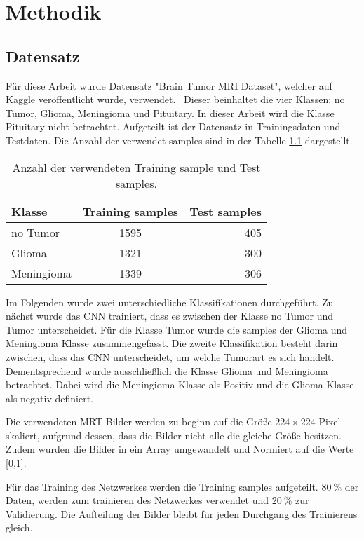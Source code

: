 \chapter{Methodik}

\section{Datensatz}
Für diese Arbeit wurde Datensatz "Brain Tumor MRI Dataset", welcher auf Kaggle veröffentlicht wurde, verwendet.~\cite{msoud_nickparvar_2021}
Dieser beinhaltet die vier Klassen: no Tumor, Glioma, Meningioma und Pituitary.
In dieser Arbeit wird die Klasse Pituitary nicht betrachtet.
Aufgeteilt ist der Datensatz in Trainingsdaten und Testdaten.
Die Anzahl der verwendet samples sind in der Tabelle \ref{tab:daten} dargestellt. 
\begin{table}[htbp]
    \centering
    \begin{tabular}{l c r}
        \hline
        Klasse      & Training samples & Test samples \\
        \hline
        no Tumor    &    1595          & 405 \\
        Glioma      &    1321          & 300 \\
        Meningioma  &    1339          & 306 \\
        \hline
  \end{tabular}
  \caption{Anzahl der verwendeten Training sample und Test samples.}
  \label{tab:daten}
\end{table}
Im Folgenden wurde zwei unterschiedliche Klassifikationen durchgeführt.
Zu nächst wurde das CNN trainiert, dass es zwischen der Klasse no Tumor und Tumor unterscheidet. Für die Klasse Tumor
wurde die samples der Glioma und Meningioma Klasse zusammengefasst.
Die zweite Klassifikation besteht darin zwischen, dass das CNN unterscheidet, um welche Tumorart es sich handelt.
Dementsprechend wurde ausschließlich die Klasse Glioma und Meningioma betrachtet.
Dabei wird die Meningioma Klasse als Positiv  und die Glioma Klasse als negativ definiert.

Die verwendeten MRT Bilder werden zu beginn auf die Größe $224 \times 224$ Pixel skaliert, aufgrund dessen, dass die Bilder nicht alle die 
gleiche Größe besitzen.
Zudem wurden die Bilder in ein Array umgewandelt und Normiert auf die Werte [0,1].

Für das Training des Netzwerkes werden die Training samples aufgeteilt. $\qty{80}{\%}$ der Daten, werden zum trainieren des Netzwerkes 
verwendet und $\qty{20}{\%}$ zur Validierung.
Die Aufteilung der Bilder bleibt für jeden Durchgang des Trainierens gleich.

